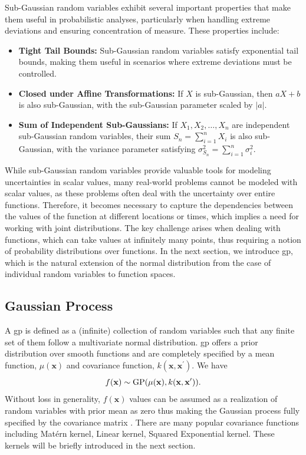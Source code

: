 Sub-Gaussian random variables exhibit several important properties that make them useful in probabilistic analyses, particularly when handling extreme deviations and ensuring concentration of measure. These properties include:  
\begin{itemize}
    \item \textbf{Tight Tail Bounds:} Sub-Gaussian random variables satisfy exponential tail bounds, making them useful in scenarios where extreme deviations must be controlled.  
    \item \textbf{Closed under Affine Transformations:} If \( X \) is sub-Gaussian, then \( aX + b \) is also sub-Gaussian, with the sub-Gaussian parameter scaled by \( \vert a \vert \).  
    \item \textbf{Sum of Independent Sub-Gaussians:} If \( X_1, X_2, \dots, X_n \) are independent sub-Gaussian random variables, their sum \( S_n = \sum_{i=1}^n X_i \) is also sub-Gaussian, with the variance parameter satisfying \( \sigma^2_{S_n} = \sum_{i=1}^n \sigma_i^2 \).  
\end{itemize} 

While sub-Gaussian random variables provide valuable tools for modeling uncertainties in scalar values, many real-world problems cannot be modeled with scalar values, as these problems often deal with the uncertainty over entire functions. Therefore, it becomes necessary to capture the dependencies between the values of the function at different locations or times, which implies a need for working with joint distributions. The key challenge arises when dealing with functions, which can take values at infinitely many points, thus requiring a notion of probability distributions over functions. In the next section,  we introduce \acf{gp}, which is the natural extension of the normal distribution from the case of individual random variables to function spaces.

\subsection{Gaussian Process}
\label{section:gaussian_process}
A \acf{gp} is defined as a (infinite) collection of random variables such that any finite set of them follow a multivariate normal distribution. \ac{gp} offers a prior distribution over smooth functions and are completely specified by a mean function, $\mu(\mathbf{x})$ and covariance function, $k(\mathbf{x}, \mathbf{x}^\prime)$. We have \begin{equation*}
    \label{def:GP}
    f({\bf x})\sim\mathrm{GP}(\mu({\bf x}),k({\bf x},{\bf x}^\prime)).
\end{equation*}
Without loss in generality, $f(\mathbf{x})$ values can be assumed as a realization of random variables with prior mean as zero thus making the Gaussian process fully specified by the covariance matrix \citep{rasmussen2006gaussian}. There are many popular covariance functions including Mat\'ern kernel, Linear kernel, Squared Exponential kernel. These kernels will be briefly introduced in the next section.

